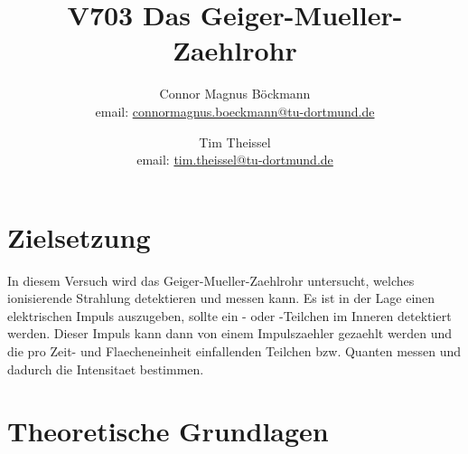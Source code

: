 \documentclass[titlepage=firstcover, captions=tableheading]{scrartcl}
\title{V703 Das Geiger-Mueller-Zaehlrohr}
\author{
Connor Magnus Böckmann \\ email: \href{mailto:connormagnus.boeckmann@tu-dortmund.de}{connormagnus.boeckmann@tu-dortmund.de}
\and Tim Theissel \\ email: \href{mailto:tim.theissel@tu-dortmund.de}{tim.theissel@tu-dortmund.de}}
\begin{document}
\maketitle
\newpage
\tableofcontents
\newpage
\section{Zielsetzung}
In diesem Versuch wird das Geiger-Mueller-Zaehlrohr untersucht, welches ionisierende Strahlung detektieren und messen kann. Es ist in der Lage einen elektrischen Impuls auszugeben, sollte ein \alpha- oder \beta-Teilchen im Inneren detektiert werden. Dieser Impuls kann dann von einem Impulszaehler gezaehlt werden und die pro Zeit- und Flaecheneinheit einfallenden Teilchen bzw. Quanten messen und dadurch die Intensitaet bestimmen. 
\section{Theoretische Grundlagen}
\end{document}
